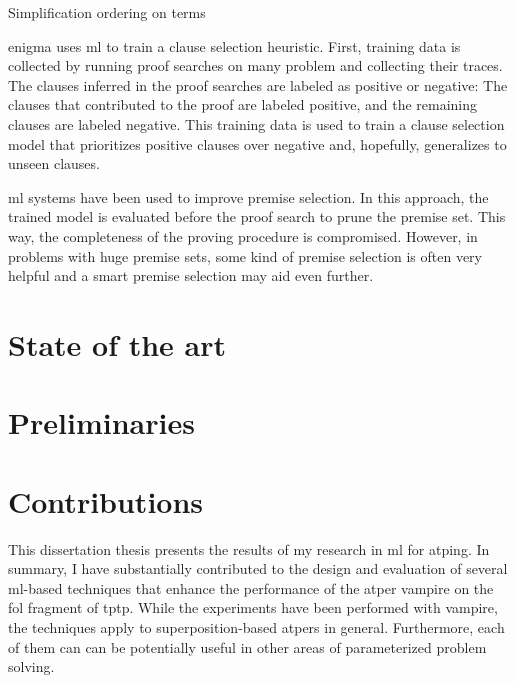 Simplification ordering on terms


\Gls{enigma} uses \gls{ml} to train a clause selection heuristic.
First, training data is collected by running proof searches on many problem and collecting their traces.
The clauses inferred in the proof searches are labeled as positive or negative:
The clauses that contributed to the proof are labeled positive, and the remaining clauses are labeled negative.
This training data is used to train a clause selection model that prioritizes positive clauses over negative and, hopefully, generalizes to unseen clauses.

\Gls{ml} systems have been used to improve premise selection.
In this approach, the trained model is evaluated before the proof search to prune the premise set.
This way, the completeness of the proving procedure is compromised.
However, in problems with huge premise sets, some kind of premise selection is often very helpful and a smart premise selection may aid even further.


\chapter{State of the art}

\chapter{Preliminaries}


\chapter{Contributions}

This dissertation thesis presents the results of my research in \gls{ml} for \gls{atping}.
In summary, I have substantially contributed to the design and evaluation of several \acrshort{ml}-based techniques that enhance the performance of the \gls{atper} \gls{vampire} on the \gls{fol} fragment of \gls{tptp}.
While the experiments have been performed with \gls{vampire},
the techniques apply to \gls{superposition}-based \glspl{atper} in general.
Furthermore, each of them can can be potentially useful in other areas of parameterized problem solving.

